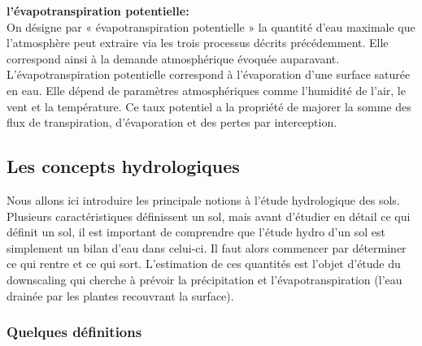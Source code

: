\documentclass[a4paper,10pt]{article}
\begin{document}
\textbf{l'évapotranspiration potentielle:}\\

On désigne par « évapotranspiration potentielle » la quantité d’eau maximale que l’atmosphère peut extraire via les trois processus décrits précédemment. Elle correspond ainsi à la demande atmosphérique évoquée auparavant. L’évapotranspiration potentielle correspond à l’évaporation d’une surface saturée en eau. Elle dépend de paramètres atmosphériques comme l’humidité de l’air, le vent et la température. Ce taux potentiel a la propriété de majorer la somme des flux de transpiration, d’évaporation et des pertes par interception.

\subsection{Les concepts hydrologiques}
\label{hydro}

Nous allons ici introduire les principale notions à l'étude hydrologique des sols. Plusieurs caractéristiques définissent un sol, mais avant d'étudier en détail ce qui définit un sol, il est important de comprendre que l'étude hydro d'un sol est simplement un bilan d'eau dans celui-ci. Il faut alors commencer par déterminer ce qui rentre et ce qui sort. L'estimation de ces quantités est l'objet d'étude du downscaling qui cherche à prévoir la précipitation et l'évapotranspiration (l'eau drainée par les plantes recouvrant la surface).

\subsubsection{Quelques définitions}
\end{document}
